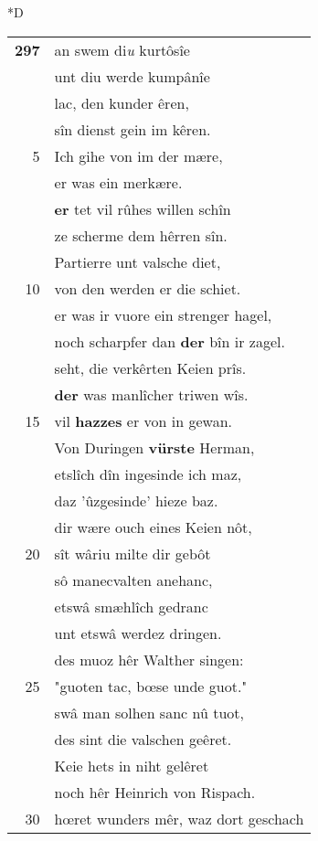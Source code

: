 \documentclass[8pt,a4paper,notitlepage]{article}
\begin{document}
\begin{table}[ht]
\begin{minipage}[t]{0.5\linewidth}
\small
\begin{center}*D
\end{center}
\begin{tabular}{rl}
\textbf{297} & an swem di\textit{u} kurtôsîe\\ 
 & unt diu werde kumpânîe\\ 
 & lac, den kunder êren,\\ 
 & sîn dienst gein im kêren.\\ 
5 & Ich gihe von im der mære,\\ 
 & er was ein merkære.\\ 
 & \textbf{er} tet vil rûhes willen schîn\\ 
 & ze scherme dem hêrren sîn.\\ 
 & Partierre unt valsche diet,\\ 
10 & von den werden er die schiet.\\ 
 & er was ir vuore ein strenger hagel,\\ 
 & noch scharpfer dan \textbf{der} bîn ir zagel.\\ 
 & seht, die verkêrten Keien prîs.\\ 
 & \textbf{der} was manlîcher triwen wîs.\\ 
15 & vil \textbf{hazzes} er von in gewan.\\ 
 & Von Duringen \textbf{vürste} Herman,\\ 
 & etslîch dîn ingesinde ich maz,\\ 
 & daz 'ûzgesinde' hieze baz.\\ 
 & dir wære ouch eines Keien nôt,\\ 
20 & sît wâriu milte dir gebôt\\ 
 & sô manecvalten anehanc,\\ 
 & etswâ smæhlîch gedranc\\ 
 & unt etswâ werdez dringen.\\ 
 & des muoz hêr Walther singen:\\ 
25 & "guoten tac, bœse unde guot."\\ 
 & swâ man solhen sanc nû tuot,\\ 
 & des sint die valschen geêret.\\ 
 & Keie hets in niht gelêret\\ 
 & noch hêr Heinrich von Rispach.\\ 
30 & hœret wunders mêr, waz dort geschach\\ 

\end{tabular}
\end{minipage}
\end{table}
\end{document}
